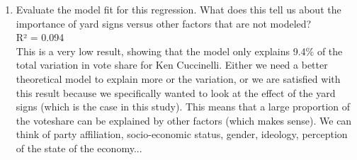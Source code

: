 \documentclass[12pt,letterpaper]{article}
\begin{document}
\begin{enumerate}
	\item [(d)] Evaluate the model fit for this regression.  What does this tell us about the importance of yard signs versus other factors that are not modeled? \\
	R² = 0.094 \\
	This is a very low result, showing that the model only explains 9.4\% of the total variation in vote share for Ken Cuccinelli. Either we need a better theoretical model to explain more or the variation, or we are satisfied with this result because we specifically wanted to look at the effect of the yard signs (which is the case in this study). This means that a large proportion of the voteshare can be explained by other factors (which makes sense). We can think of party affiliation, socio-economic status, gender, ideology, perception of the state of the economy...
	
	
	

	
	
	
\end{enumerate}  
\end{document}
